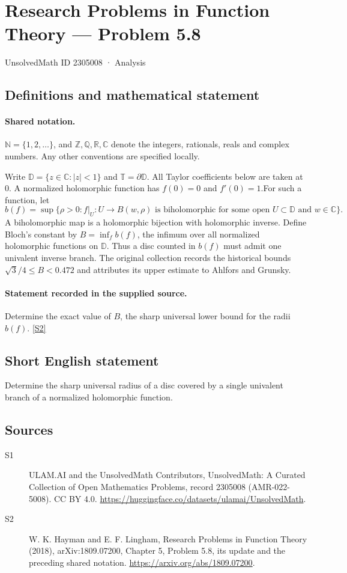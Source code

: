\documentclass[11pt]{article}
\newcommand{\sref}[2]{\hyperlink{source:#1:#2}{[S#2]}}
\begin{document}
\setcounter{section}{2305007}
\section{Research Problems in Function Theory — Problem 5.8}\label{2305008}
{\small\sffamily UnsolvedMath ID 2305008 · Analysis}
\subsection{Definitions and mathematical statement}

\paragraph{Shared notation.}$\mathbb N=\{1,2,\ldots\}$, and $\mathbb Z,\mathbb Q,\mathbb R,\mathbb C$ denote the integers, rationals, reals and complex numbers. Any other conventions are specified locally.


Write $\mathbb D=\{z\in\mathbb C:|z|<1\}$ and $\mathbb T=\partial\mathbb D$. All Taylor coefficients below are taken at $0$. A normalized holomorphic function has $f(0)=0$ and $f'(0)=1$.For such a function, let
\[b(f)=\sup\{\rho>0: f|_U:U\longrightarrow B(w,\rho)\text{ is biholomorphic for some open }U\subset\mathbb D\text{ and }w\in\mathbb C\}.\]
A biholomorphic map is a holomorphic bijection with holomorphic inverse. Define Bloch's constant by $B=\inf_f b(f)$, the infimum over all normalized holomorphic functions on $\mathbb D$. Thus a disc counted in $b(f)$ must admit one univalent inverse branch. The original collection records the historical bounds $\sqrt3/4\le B<0.472$ and attributes its upper estimate to Ahlfors and Grunsky.
\paragraph{Statement recorded in the supplied source.}
Determine the exact value of $B$, the sharp universal lower bound for the radii $b(f)$. \sref{2305008}{2}
\subsection{Short English statement}
Determine the sharp universal radius of a disc covered by a single univalent branch of a normalized holomorphic function.
\subsection{Sources}
\begin{description}
\item[\hypertarget{source:2305008:1}{S1}] ULAM.AI and the UnsolvedMath Contributors, UnsolvedMath: A Curated Collection of Open Mathematics Problems, record 2305008 (AMR-022-5008). CC BY 4.0. \url{https://huggingface.co/datasets/ulamai/UnsolvedMath}.
\item[\hypertarget{source:2305008:2}{S2}] W. K. Hayman and E. F. Lingham, Research Problems in Function Theory (2018), arXiv:1809.07200, Chapter 5, Problem 5.8, its update and the preceding shared notation. \url{https://arxiv.org/abs/1809.07200}.
\end{description}
\label{end:2305008}
\end{document}
